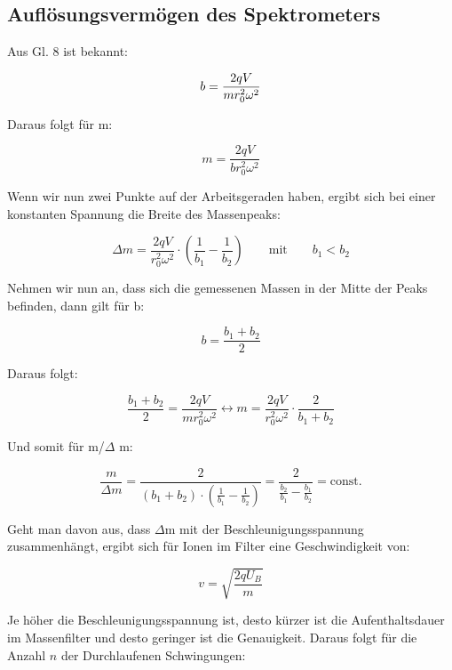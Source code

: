 \newpage
\subsection{Auflösungsvermögen des Spektrometers}
Aus Gl. 8 ist bekannt:

\begin{equation}
\notag
b = \frac{2qV}{mr_{0}^{2}\omega^{2}}
\end{equation}

Daraus folgt für m:

\begin{equation}
m = \frac{2qV}{br_{0}^{2}\omega^{2}}
\end{equation}

Wenn wir nun zwei Punkte auf der Arbeitsgeraden haben, ergibt sich bei einer konstanten Spannung die Breite des Massenpeaks:

\begin{equation}
\Delta m = \frac{2qV}{r_{0}^{2}\omega^{2}}\cdot \left( \frac{1}{b_1}-\frac{1}{b_2}\right) \qquad \text{mit} \qquad b_1 < b_2
\end{equation}

Nehmen wir nun an, dass sich die gemessenen Massen in der Mitte der Peaks befinden, dann gilt für b:

\begin{equation}
b = \frac{b_1 + b_2}{2}
\end{equation}

Daraus folgt:

\begin{equation}
\frac{b_1 + b_2}{2}=\frac{2qV}{mr_0^2 \omega^2} \leftrightarrow m = \frac{2qV}{r_0^2 \omega^2}\cdot \frac{2}{b_1 + b_2}
\end{equation}

Und somit für m/$\Delta$ m:

\begin{equation}
\frac{m}{\Delta m} = \frac{2}{(b_1+b_2)\cdot \left(\frac{1}{b_1}-\frac{1}{b_2}\right)} = \frac{2}{\frac{b_2}{b_1}-\frac{b_1}{b_2}} = \text{const.}
\end{equation}

Geht man davon aus, dass $\Delta$m mit der Beschleunigungsspannung zusammenhängt, ergibt sich für Ionen im Filter eine Geschwindigkeit von:

\begin{equation}
v=\sqrt{\frac{2qU_B}{m}}
\end{equation}

Je höher die Beschleunigungsspannung ist, desto kürzer ist die Aufenthaltsdauer im Massenfilter und desto geringer ist die Genauigkeit. Daraus folgt für die Anzahl $n$ der Durchlaufenen Schwingungen:

